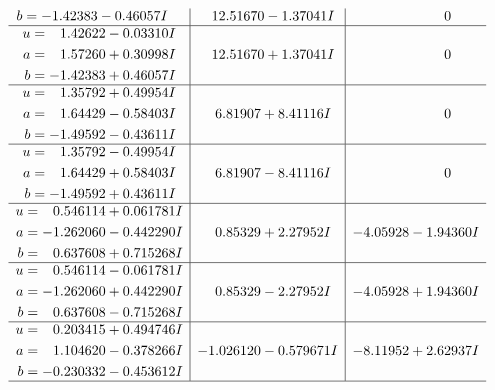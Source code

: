 \documentclass[1p]{elsarticle_modified}
\theoremstyle{definition}
\begin{document}
$$\begin{array}{c|c|c}
\begin{aligned}
b &= -1.42383 - 0.46057 I\end{aligned}
 & \phantom{-}12.51670 - 1.37041 I & \phantom{-0.000000 } 0 \\ \hline\begin{aligned}
u &= \phantom{-}1.42622 - 0.03310 I \\
a &= \phantom{-}1.57260 + 0.30998 I \\
b &= -1.42383 + 0.46057 I\end{aligned}
 & \phantom{-}12.51670 + 1.37041 I & \phantom{-0.000000 } 0 \\ \hline\begin{aligned}
u &= \phantom{-}1.35792 + 0.49954 I \\
a &= \phantom{-}1.64429 - 0.58403 I \\
b &= -1.49592 - 0.43611 I\end{aligned}
 & \phantom{-}6.81907 + 8.41116 I & \phantom{-0.000000 } 0 \\ \hline\begin{aligned}
u &= \phantom{-}1.35792 - 0.49954 I \\
a &= \phantom{-}1.64429 + 0.58403 I \\
b &= -1.49592 + 0.43611 I\end{aligned}
 & \phantom{-}6.81907 - 8.41116 I & \phantom{-0.000000 } 0 \\ \hline\begin{aligned}
u &= \phantom{-}0.546114 + 0.061781 I \\
a &= -1.262060 - 0.442290 I \\
b &= \phantom{-}0.637608 + 0.715268 I\end{aligned}
 & \phantom{-}0.85329 + 2.27952 I & -4.05928 - 1.94360 I \\ \hline\begin{aligned}
u &= \phantom{-}0.546114 - 0.061781 I \\
a &= -1.262060 + 0.442290 I \\
b &= \phantom{-}0.637608 - 0.715268 I\end{aligned}
 & \phantom{-}0.85329 - 2.27952 I & -4.05928 + 1.94360 I \\ \hline\begin{aligned}
u &= \phantom{-}0.203415 + 0.494746 I \\
a &= \phantom{-}1.104620 - 0.378266 I \\
b &= -0.230332 - 0.453612 I\end{aligned}
 & -1.026120 - 0.579671 I & -8.11952 + 2.62937 I\\
 \hline 

\end{array}$$
\end{document}
